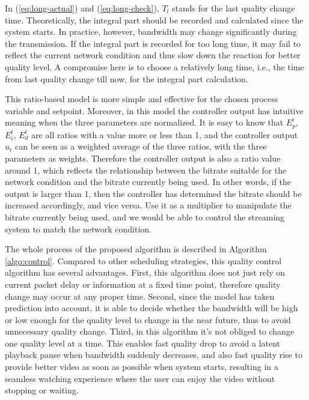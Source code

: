 \documentclass[journal]{IEEEtran}
\begin{document}
In (\ref{eq:long-actual}) and (\ref{eq:long-check}), $T_l$ stands for the last quality change time. Theoretically, the integral part should be recorded and calculated since the system starts. In practice, however, bandwidth may change significantly during the transmission. If the integral part is recorded for too long time, it may fail to reflect the current network condition and thus slow down the reaction for better quality level. A compromise here is to choose a relatively long time, i.e., the time from last quality change till now, for the integral part calculation.

This ratio-based model is more simple and effective for the chosen process variable and setpoint. Moreover, in this model the controller output has intuitive meaning when the three parameters are normalized. It is easy to know that $E_p^t$, $E_i^t$, $E_d^t$ are all ratios with a value more or less than 1, and the controller output $u_t$ can be seen as a weighted average of the three ratios, with the three parameters as weights. Therefore the controller output is also a ratio value around 1, which reflects the relationship between the bitrate suitable for the network condition and the bitrate currently being used. In other words, if the output is larger than 1, then the controller has determined the bitrate should be increased accordingly, and vice versa. Use it as a multiplier to manipulate the bitrate currently being used, and we would be able to control the streaming system to match the network condition.

The whole process of the proposed algorithm is described in Algorithm \ref{algo:control}. Compared to other scheduling strategies, this quality control algorithm has several advantages. First, this algorithm does not just rely on current packet delay or information at a fixed time point, therefore quality change may occur at any proper time. Second, since the model has taken prediction into account, it is able to decide whether the bandwidth will be high or low enough for the quality level to change in the near future, thus to avoid unnecessary quality change. Third, in this algorithm it's not obliged to change one quality level at a time. This enables fast quality drop to avoid a latent playback pause when bandwidth suddenly decreases, and also fast quality rise to provide better video as soon as possible when system starts, resulting in a seamless watching experience where the user can enjoy the video without stopping or waiting.
\end{document}
